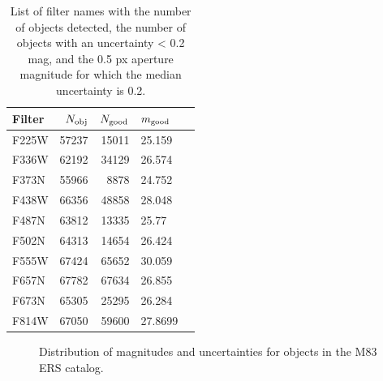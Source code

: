 \begin{table}
\centering
\caption{List of filter names with the number of objects detected, the number of objects with an uncertainty < 0.2 mag, and the 0.5 px aperture magnitude for which the median uncertainty is 0.2.}
\label{tab:cat_numbers}
\begin{tabular}{lrrlr}
\hline\hline
Filter & $N_{\rm obj}$ & $N_{\rm good}$ & $m_{\rm good}$ \\
\hline
F225W &  57237 & 15011 & 25.159 \\
F336W &  62192 & 34129 & 26.574 \\
F373N &  55966 & 8878 & 24.752 \\
F438W &  66356 & 48858 & 28.048 \\
F487N &  63812 & 13335 & 25.77 \\
F502N &  64313 & 14654 & 26.424 \\
F555W &  67424 & 65652 & 30.059 \\
F657N &  67782 & 67634 & 26.855 \\
F673N &  65305 & 25295 & 26.284 \\
F814W &  67050 & 59600 & 27.8699 \\
\hline
\end{tabular}
\end{table}

\begin{figure}
\centering
{}
\hfill
{}
\caption{Distribution of magnitudes and uncertainties for objects in the \citet{chandar10} M83 ERS catalog.}
\label{fig:mag_unc}
\end{figure}

